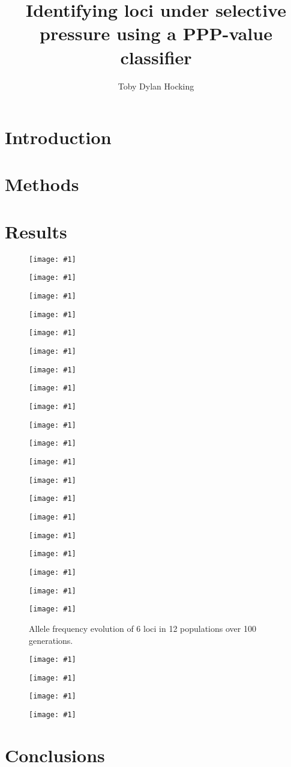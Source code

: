 \documentclass{TDH-article}
\title{Identifying loci under selective pressure using a PPP-value classifier}
\author{Toby Dylan Hocking}
\begin{document}
\maketitle

\section{Introduction}

\section{Methods}

\section{Results}

\newcommand{\fig}[2]{
  \begin{figure}[ht]
    \texttt{[image: \#1]}
    \caption{#2}
  \end{figure}
}


\fig{2009-08-27-notbeta.pdf}{}
\fig{anc-est-plot.pdf}{}
\fig{beta.pdf}{}
\fig{classify-loci-few.pdf}{}
\fig{classify-loci-neu.pdf}{}
\fig{classify-loci.pdf}{}
\fig{c-over-time-all.pdf}{}
\fig{c-over-time-diff.pdf}{}
\fig{c-over-time-same.pdf}{}
\fig{cutoff-plot-few.pdf}{}
\fig{cutoff-plot-neu.pdf}{}
\fig{cutoff-plot.pdf}{}
\fig{dens-several-s-few.pdf}{}
\fig{dens-several-s-neu.pdf}{}
\fig{dens-several-s.pdf}{}
\fig{fixation-endpoints.pdf}{}
\fig{gen-pop-dens.pdf}{}
\fig{gen-pop.pdf}{}
\fig{gen-pop-roc.pdf}{}
\fig{loci-over-time}{Allele frequency evolution of 6 loci in 12
  populations over 100 generations.}
\fig{roc-desc.pdf}{}
\fig{roc-s.pdf}{}
\fig{sim-summary-plot.pdf}{}
\fig{fixation-selection.png}{}

\section{Conclusions}
\end{document}
